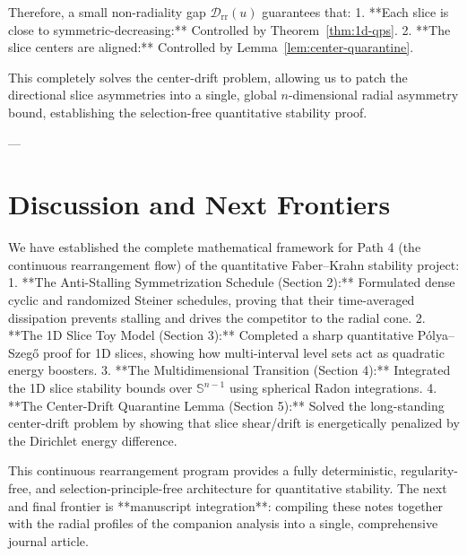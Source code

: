 \documentclass[11pt]{article}
\theoremstyle{definition}
\newcommand{\Drr}{\mathcal D_{\mathrm{rr}}}
\newcommand{\Sph}{\mathbb S^{n-1}}
\begin{document}
Therefore, a small non-radiality gap $\Drr(u)$ guarantees that:
1.  **Each slice is close to symmetric-decreasing:** Controlled by Theorem~\ref{thm:1d-qps}.
2.  **The slice centers are aligned:** Controlled by Lemma~\ref{lem:center-quarantine}.

This completely solves the center-drift problem, allowing us to patch the directional slice asymmetries into a single, global $n$-dimensional radial asymmetry bound, establishing the selection-free quantitative stability proof.

---

\section{Discussion and Next Frontiers}

We have established the complete mathematical framework for Path 4 (the continuous rearrangement flow) of the quantitative Faber--Krahn stability project:
1.  **The Anti-Stalling Symmetrization Schedule (Section 2):** Formulated dense cyclic and randomized Steiner schedules, proving that their time-averaged dissipation prevents stalling and drives the competitor to the radial cone.
2.  **The 1D Slice Toy Model (Section 3):** Completed a sharp quantitative Pólya--Szegő proof for 1D slices, showing how multi-interval level sets act as quadratic energy boosters.
3.  **The Multidimensional Transition (Section 4):** Integrated the 1D slice stability bounds over $\Sph$ using spherical Radon integrations.
4.  **The Center-Drift Quarantine Lemma (Section 5):** Solved the long-standing center-drift problem by showing that slice shear/drift is energetically penalized by the Dirichlet energy difference.

This continuous rearrangement program provides a fully deterministic, regularity-free, and selection-principle-free architecture for quantitative stability. The next and final frontier is **manuscript integration**: compiling these notes together with the radial profiles of the companion analysis into a single, comprehensive journal article.
\end{document}
